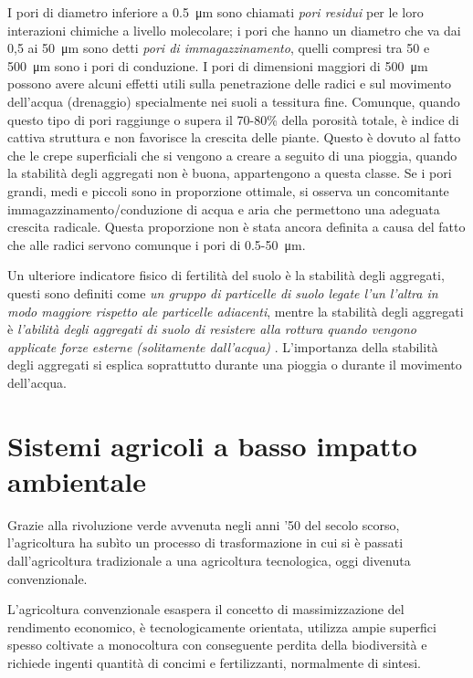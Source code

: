 \documentclass[11pt, a4paper, openright, titlepage, final, language = italian]{book}
\begin{document}
I pori di diametro inferiore a \SI{0.5}{\micro\metre} sono chiamati
\textit{pori residui} per le loro interazioni chimiche a livello
molecolare; i pori che hanno un diametro che va dai 0,5 ai
\SI{50}{\micro\metre} sono detti \textit{pori di immagazzinamento},
quelli compresi tra 50 e \SI{500}{\micro\metre} sono i pori di
conduzione. I pori di dimensioni maggiori di \SI{500}{\micro\metre}
possono avere alcuni effetti utili sulla penetrazione delle radici e
sul movimento dell’acqua (drenaggio) specialmente nei suoli a
tessitura fine. Comunque, quando questo tipo di pori raggiunge o
supera il 70-80\% della porosit\`a totale, è indice di cattiva
struttura e non favorisce la crescita delle piante. Questo è dovuto al
fatto che le crepe superficiali che si vengono a creare a seguito di
una pioggia, quando la stabilit\`a degli aggregati non è buona,
appartengono a questa classe. Se i pori grandi, medi e piccoli sono in
proporzione ottimale, si osserva un concomitante
immagazzinamento/conduzione di acqua e aria che permettono una
adeguata crescita radicale. Questa proporzione non è stata ancora
definita a causa del fatto che alle radici servono comunque i pori di
0.5-\SI{50}{\micro\meter}. 

Un ulteriore indicatore fisico di fertilit\`a del suolo \`e la
stabilit\`a degli aggregati, questi sono definiti come \emph{un gruppo
  di particelle di suolo legate l'un l'altra in modo maggiore rispetto
  ale particelle adiacenti}, mentre la stabilit\`a degli aggregati \`e
\emph{l'abilit\`a degli aggregati di suolo di resistere alla rottura
  quando vengono applicate forze esterne (solitamente dall'acqua)}
\citep{SoilQualStab}. L'importanza della stabilit\`a degli aggregati
si esplica soprattutto durante una pioggia o durante il movimento
dell'acqua.



\section{Sistemi agricoli a basso impatto ambientale}
Grazie alla rivoluzione verde avvenuta negli anni '50 del secolo
scorso, l'agricoltura ha sub\`ito un processo di trasformazione in cui
si è passati dall'agricoltura tradizionale a una agricoltura
tecnologica, oggi divenuta convenzionale.

L'agricoltura convenzionale esaspera il concetto di massimizzazione
del rendimento economico, \`e tecnologicamente orientata, utilizza
ampie superfici spesso coltivate a monocoltura con conseguente perdita
della biodiversit\`a e richiede ingenti quantit\`a di
concimi e fertilizzanti, normalmente di sintesi.
\end{document}
